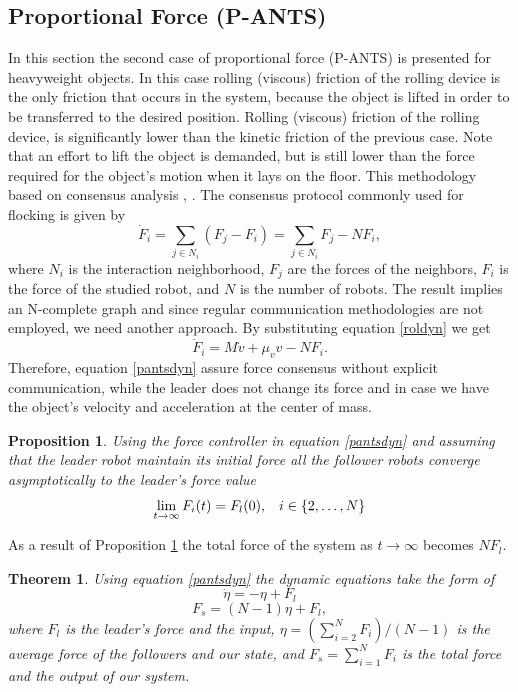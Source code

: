 \documentclass[letterpaper, 10 pt, conference]{ieeeconf}
\newtheorem{proposition}{\textbf{Proposition}}
\newtheorem{theorem}{\textbf{Theorem}}
\begin{document}
\subsection{Proportional Force (P-ANTS)}\label{pants}
In this section the second case of proportional force (P-ANTS) is presented for heavyweight objects. In this case rolling (viscous) friction of the rolling device is the only friction that occurs in the system, because the object is lifted in order to be transferred to the desired position. Rolling (viscous) friction of the rolling device, is significantly lower than the kinetic friction of the previous case. Note that an effort to lift the object is demanded, but is still lower than the force required for the object's motion when it lays on the floor. This methodology based on consensus analysis \cite{olfati2007consensus}, \cite{olfati2004consensus}. The consensus protocol commonly used for flocking is given by
\begin{equation}\label{consensus}
\dot{F}_i=\sum_{j \in N_i} (F_j - F_i)=\sum_{j \in N_i}F_j-NF_i,
\end{equation}
where $N_i$ is the interaction neighborhood, $F_j$ are the forces of the neighbors, $F_i$ is the force of the studied robot, and $N$ is the number of robots. The result implies an N-complete graph and since regular communication methodologies are not employed, we need another approach. By substituting equation \ref{roldyn} we get
\begin{equation}\label{pantsdyn}
\dot{F}_i=M\dot{v}+\mu_v v-NF_i.
\end{equation} 
Therefore, equation \ref{pantsdyn} assure force consensus without explicit communication, while the leader does not change its force and in case we have the object's velocity and acceleration at the center of mass.\vspace{.2cm}
\begin{proposition}\label{pr2}
\textit{Using the force controller in equation \ref{pantsdyn} and assuming that the leader robot maintain its initial force all the follower robots converge asymptotically to the leader's force value
\begin{equation}
\lim\limits_{t \rightarrow \infty} F_i(t)=F_l(0), \hspace{.3cm} i\in \{2, \hdots, N\}
\end{equation}} \vspace{.2cm}
\end{proposition}
As a result of Proposition \ref{pr2} the total force of the system as $t \rightarrow \infty$ becomes $NF_l$.\begin{theorem}\label{thrm5}
\textit{Using equation \ref{pantsdyn} the dynamic equations take the form of
\begin{equation}
\dot{\eta}=-\eta+F_l
\end{equation}
\begin{equation}
F_s=(N-1)\eta+F_l,
\end{equation}
where $F_l$ is the leader's force and the input, $\eta=(\sum_{i=2}^{N}F_i)/(N-1)$ is the average force of the followers and our state, and $F_s=\sum_{i=1}^N F_i$ is the total force and the output of our system.} 
\vspace{.2cm}
\end{theorem}
\end{document}
